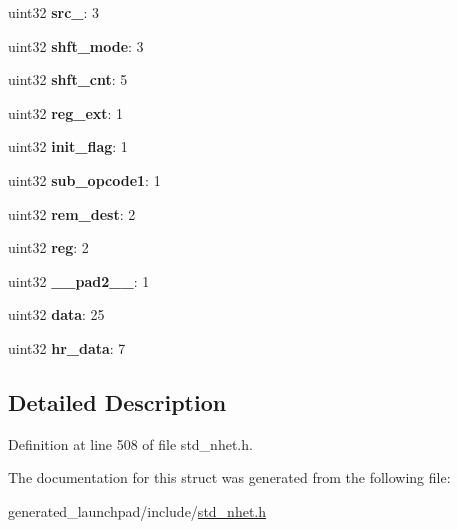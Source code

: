 \begin{DoxyCompactItemize}
\mbox{\label{structADC__format_a818af35cc68ec114e65ed45197768853}} 
uint32 {\bfseries src\+\_}\+: 3
\item 
\mbox{\label{structADC__format_a12584bb03799c9d982bf153197083271}} 
uint32 {\bfseries shft\+\_\+mode}\+: 3
\item 
\mbox{\label{structADC__format_a20da133a66b5a81d922335a32edec50b}} 
uint32 {\bfseries shft\+\_\+cnt}\+: 5
\item 
\mbox{\label{structADC__format_a7048e29cfa5b2d2125f2abdde2235c8a}} 
uint32 {\bfseries reg\+\_\+ext}\+: 1
\item 
\mbox{\label{structADC__format_a9d331d0c340d62df42c5882aacaf5f45}} 
uint32 {\bfseries init\+\_\+flag}\+: 1
\item 
\mbox{\label{structADC__format_aac5bcbe6cb59c49a0ddf4be6296bd14c}} 
uint32 {\bfseries sub\+\_\+opcode1}\+: 1
\item 
\mbox{\label{structADC__format_a02517c8c5028e42c2e0e23095c85843a}} 
uint32 {\bfseries rem\+\_\+dest}\+: 2
\item 
\mbox{\label{structADC__format_a3417eeee71c003a79ce788ac03be6d8c}} 
uint32 {\bfseries reg}\+: 2
\item 
\mbox{\label{structADC__format_ae0a881872b4e25ed30e4dc46d5d7ab0a}} 
uint32 {\bfseries \+\_\+\+\_\+pad2\+\_\+\+\_\+}\+: 1
\item 
\mbox{\label{structADC__format_a217e59dbe1b54c3260aed85c8a4a3f85}} 
uint32 {\bfseries data}\+: 25
\item 
\mbox{\label{structADC__format_a6aa73ebc4223e266b0d00f69a76ba7c0}} 
uint32 {\bfseries hr\+\_\+data}\+: 7
\end{DoxyCompactItemize}


\subsection{Detailed Description}


Definition at line 508 of file std\+\_\+nhet.\+h.



The documentation for this struct was generated from the following file\+:\begin{DoxyCompactItemize}
\item 
generated\+\_\+launchpad/include/\mbox{\hyperlink{std__nhet_8h}{std\+\_\+nhet.\+h}}\end{DoxyCompactItemize}
